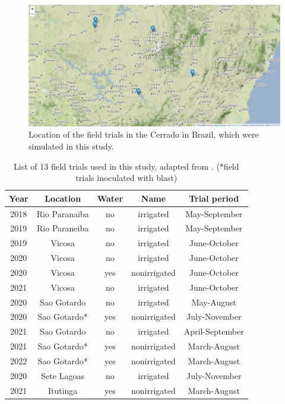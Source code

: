 \documentclass[a4paper,12pt,oneside]{article}
\begin{document}
\begin{figure}[htbp]
\centering
\includegraphics[width=1\textwidth]{./figures/Brazil.png}
\caption{Location of the field trials in the Cerrado in Brazil, which were simulated in this study.}
\end{figure}

\begin{table}[htbp]
\caption{\label{list}List of 13 field trials used in this study, adapted from \cite{casagrande-2023-new-brazil}. (*field trials inoculated with blast)}
\centering
\begin{tabular}{|ccccc|}
\hline
Year & Location & Water & Name & Trial period\\
\hline
\hline
2018 & Rio Paranaiba & no & irrigated & May-September\\
\hline
2019 & Rio Paraneiba & no & irrigated & May-September\\
\hline
2019 & Vicosa & no & irrigated & June-October\\
\hline
2020 & Vicosa & no & irrigated & June-October\\
\hline
2020 & Vicosa & yes & nonirrigated & June-October\\
\hline
2021 & Vicosa & no & irrigated & June-October\\
\hline
2020 & Sao Gotardo & no & irrigated & May-August\\
\hline
2020 & Sao Gotardo* & yes & nonirrigated & July-November\\
\hline
2021 & Sao Gotardo & no & irrigated & April-September\\
\hline
2021 & Sao Gotardo* & yes & nonirrigated & March-August\\
\hline
2022 & Sao Gotardo* & yes & nonirrigated & March-August\\
\hline
2020 & Sete Lagoas & no & irrigated & July-November\\
\hline
2021 & Itutinga & yes & nonirrigated & March-August\\
\hline
\end{tabular}
\end{table}
\end{document}
